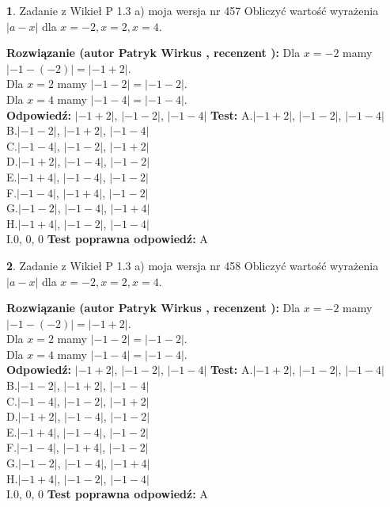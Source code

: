 \documentclass[12pt, a4paper]{article}
\theoremstyle{definition} %
\newtheorem{zad}{}
\newcommand{\zadStart}[1]{\begin{zad}#1\newline}
\newcommand{\zadStop}{\end{zad}}
\newcommand{\rozwStart}[2]{\noindent \textbf{Rozwiązanie (autor #1 , recenzent #2): }\newline}
\newcommand{\rozwStop}{\newline}
\newcommand{\odpStart}{\noindent \textbf{Odpowiedź:}\newline}
\newcommand{\odpStop}{\newline}
\newcommand{\testStart}{\noindent \textbf{Test:}\newline}
\newcommand{\testStop}{\newline}
\newcommand{\kluczStart}{\noindent \textbf{Test poprawna odpowiedź:}\newline}
\newcommand{\kluczStop}{\newline}
\begin{document}
\zadStart{Zadanie z Wikieł P 1.3 a) moja wersja nr 457}
Obliczyć wartość wyrażenia $|a - x|$ dla $x=-2,x=2,x=4$.
\zadStop
\rozwStart{Patryk Wirkus}{}
Dla $x = -2$ mamy $|-1 - (-2)| = |-1 + 2|$.\\
Dla $x = 2$ mamy $|-1 - 2| = |-1 - 2|$.\\
Dla $x = 4$ mamy $|-1 - 4| = |-1 - 4|$.\\
\rozwStop
\odpStart
$|-1 + 2|$, $|-1 - 2|$, $|-1 - 4|$
\odpStop
\testStart
A.$|-1 + 2|$, $|-1 - 2|$, $|-1 - 4|$\\
B.$|-1 - 2|$, $|-1 + 2|$, $|-1 - 4|$\\
C.$|-1 - 4|$, $|-1 - 2|$, $|-1 + 2|$\\
D.$|-1 + 2|$, $|-1 - 4|$, $|-1 - 2|$\\
E.$|-1 + 4|$, $|-1 - 4|$, $|-1 - 2|$\\
F.$|-1 - 4|$, $|-1 + 4|$, $|-1 - 2|$\\
G.$|-1 - 2|$, $|-1 - 4|$, $|-1 + 4|$\\
H.$|-1 + 4|$, $|-1 - 2|$, $|-1 - 4|$\\
I.$0$, $0$, $0$
\testStop
\kluczStart
A
\kluczStop



\zadStart{Zadanie z Wikieł P 1.3 a) moja wersja nr 458}
Obliczyć wartość wyrażenia $|a - x|$ dla $x=-2,x=2,x=4$.
\zadStop
\rozwStart{Patryk Wirkus}{}
Dla $x = -2$ mamy $|-1 - (-2)| = |-1 + 2|$.\\
Dla $x = 2$ mamy $|-1 - 2| = |-1 - 2|$.\\
Dla $x = 4$ mamy $|-1 - 4| = |-1 - 4|$.\\
\rozwStop
\odpStart
$|-1 + 2|$, $|-1 - 2|$, $|-1 - 4|$
\odpStop
\testStart
A.$|-1 + 2|$, $|-1 - 2|$, $|-1 - 4|$\\
B.$|-1 - 2|$, $|-1 + 2|$, $|-1 - 4|$\\
C.$|-1 - 4|$, $|-1 - 2|$, $|-1 + 2|$\\
D.$|-1 + 2|$, $|-1 - 4|$, $|-1 - 2|$\\
E.$|-1 + 4|$, $|-1 - 4|$, $|-1 - 2|$\\
F.$|-1 - 4|$, $|-1 + 4|$, $|-1 - 2|$\\
G.$|-1 - 2|$, $|-1 - 4|$, $|-1 + 4|$\\
H.$|-1 + 4|$, $|-1 - 2|$, $|-1 - 4|$\\
I.$0$, $0$, $0$
\testStop
\kluczStart
A
\kluczStop
\end{document}
